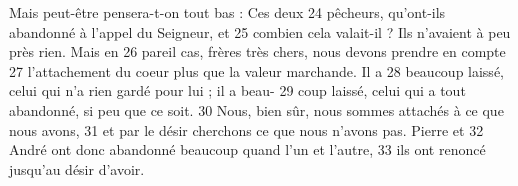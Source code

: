 Mais peut-être pensera-t-on tout bas : Ces deux	 
24	 	pêcheurs, qu'ont-ils abandonné à l'appel du Seigneur, et	 
25	 	combien cela valait-il ? Ils n'avaient à peu près rien. Mais en	 
26	 	pareil cas, frères très chers, nous devons prendre en compte	 
27	 	l'attachement du coeur plus que la valeur marchande. Il a	 
28	 	beaucoup laissé, celui qui n'a rien gardé pour lui ; il a beau-	 
29	 	coup laissé, celui qui a tout abandonné, si peu que ce soit.	 
30	 	Nous, bien sûr, nous sommes attachés à ce que nous avons,	 
31	 	et par le désir cherchons ce que nous n'avons pas. Pierre et	 
32	 	André ont donc abandonné beaucoup quand l'un et l'autre,	 
33	 	ils ont renoncé jusqu'au désir d'avoir.